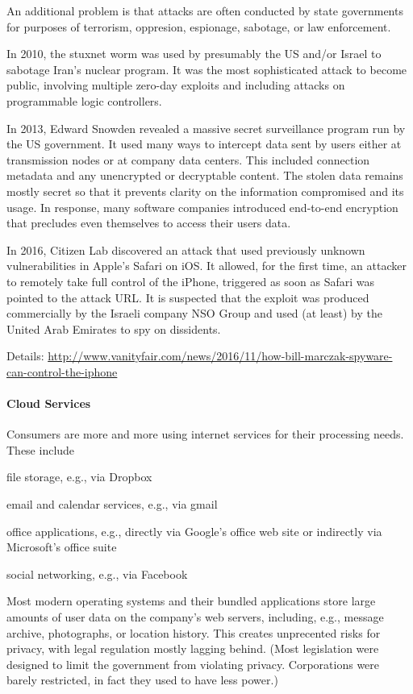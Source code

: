 An additional problem is that attacks are often conducted by state governments for purposes of terrorism, oppresion, espionage, sabotage, or law enforcement.

In 2010, the stuxnet worm was used by presumably the US and/or Israel to sabotage Iran's nuclear program.
It was the most sophisticated attack to become public, involving multiple zero-day exploits and including attacks on programmable logic controllers.

In 2013, Edward Snowden revealed a massive secret surveillance program run by the US government.
It used many ways to intercept data sent by users either at transmission nodes or at company data centers.
This included connection metadata and any unencrypted or decryptable content.
The stolen data remains mostly secret so that it prevents clarity on the information compromised and its usage.
In response, many software companies introduced end-to-end encryption that precludes even themselves to access their users data.

In 2016, Citizen Lab discovered an attack that used previously unknown vulnerabilities in Apple's Safari on iOS.
It allowed, for the first time, an attacker to remotely take full control of the iPhone, triggered as soon as Safari was pointed to the attack URL.
It is suspected that the exploit was produced commercially by the Israeli company NSO Group and used (at least) by the United Arab Emirates to spy on dissidents.

Details: \url{http://www.vanityfair.com/news/2016/11/how-bill-marczak-spyware-can-control-the-iphone}

\paragraph{Cloud Services}
Consumers are more and more using internet services for their processing needs.
These include
\begin{compactitem}
\item file storage, e.g., via Dropbox
\item email and calendar services, e.g., via gmail
\item office applications, e.g., directly via Google's office web site or indirectly via Microsoft's office suite
\item social networking, e.g., via Facebook
\end{compactitem}
Most modern operating systems and their bundled applications store large amounts of user data on the company's web servers, including, e.g., message archive, photographs, or location history.
This creates unprecented risks for privacy, with legal regulation mostly lagging behind.
(Most legislation were designed to limit the government from violating privacy.
Corporations were barely restricted, in fact they used to have less power.)

